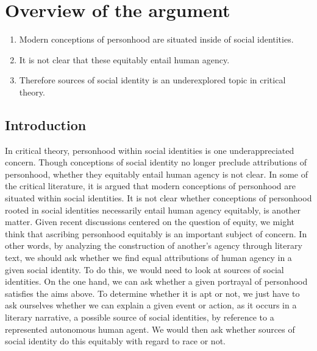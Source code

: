 \documentclass[phdthesis,12pt,final]{wuthesis}
\theoremstyle{definition}
\theoremstyle{definition}
\theoremstyle{definition}
\theoremstyle{definition}
\theoremstyle{remark}
\begin{document}
\section{Overview of the argument}\label{overview-of-the-argument}

\begin{enumerate}
\def\labelenumi{\arabic{enumi}.}
\tightlist
\item
  Modern conceptions of personhood are situated inside of social identities.
\item
  It is not clear that these equitably entail human agency.
\item
  Therefore sources of social identity is an underexplored topic in critical theory.
\end{enumerate}

\subsection*{Introduction}\label{introduction-2}

In critical theory, personhood within social identities is one underappreciated concern. Though conceptions of social identity no longer preclude attributions of personhood, whether they equitably entail human agency is not clear. In some of the critical literature, it is argued that modern conceptions of personhood are situated within social identities. It is not clear whether conceptions of personhood rooted in social identities necessarily entail human agency equitably, is another matter. Given recent discussions centered on the question of equity, we might think that ascribing personhood equitably is an important subject of concern. In other words, by analyzing the construction of another's agency through literary text, we should ask whether we find equal attributions of human agency in a given social identity. To do this, we would need to look at sources of social identities. On the one hand, we can ask whether a given portrayal of personhood satisfies the aims above. To determine whether it is apt or not, we just have to ask ourselves whether we can explain a given event or action, as it occurs in a literary narrative, a possible source of social identities, by reference to a represented autonomous human agent. We would then ask whether sources of social identity do this equitably with regard to race or not.
\end{document}
